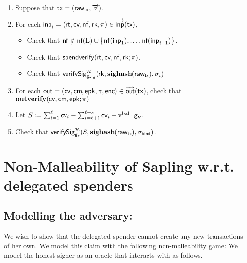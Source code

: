 \documentclass[11pt]{article}
\numberwithin{equation}{section} %
\numberwithin{figure}{section} %
\newcommand{\inp}{\ensuremath{\mathsf{inp}}\xspace}
\newcommand{\inps}{\ensuremath{\overrightarrow{\mathsf{inp}}}\xspace}
\newcommand{\outs}{\ensuremath{\overrightarrow{\mathsf{out}}}\xspace}
\newcommand{\out}{\ensuremath{\mathsf{out}}\xspace}
\newcommand{\set}[1]{\ensuremath{\left\{#1\right\}}\xspace}
\begin{document}
\noindent
\underline{\verifytx{\ledger}{\tx}}

\begin{enumerate}
\item Suppose that $\mathsf{tx}=(\mathsf{raw_{tx}},\overrightarrow{\mathsf{\sigma}})$.
\item For each $\inp_i =(\rt,\cv,\nf,\rk,\prf)\in \inps(\tx)$,
 \begin{itemize}
  \item Check that $\nf \notin \nfof{\ledger}\cup \set{\nfof{\inp_1},\ldots,\nfof{\inp_{i-1}}}$.
  \item Check that $\mathsf{spendverify}(\mathsf{rt},\mathsf{cv},\mathsf{nf},\mathsf{rk};\pi)$.
  \item Check that $\mathsf{verifySig}^{\mathcal R}_{\mathsf{g}_{\mathbf{sig}}}(\mathsf{rk},\mathbf{sighash}(\mathsf{raw_{tx}}),\sigma_i)$
 \end{itemize}
\item For each $\out = (\cv,\cm,\epk,\prf,\noteenc)\in\outs(\tx)$, check that  $\mathbf{outverify}(\mathsf{cv},\mathsf{cm},\mathsf{epk};\pi)$
\item Let $S:=\sum_{i=1}^\ell \mathsf{cv}_i - \sum_{i=\ell+1}^{\ell+s}\mathsf{cv}_i-\mathrm{v^{bal}}\cdot \mathsf{g}_{\mathbf{v}}$.
\item Check that $\mathsf{verifySig}^{\mathcal R}_{\mathsf{g}_\mathbf{r}}(S,\mathbf{sighash}(\mathsf{raw_{tx}}),\sigma_{\mathsf{bind}})$.
\end{enumerate}







\section{Non-Malleability of Sapling w.r.t. delegated spenders}

\subsection*{Modelling the adversary:}
We wish to show that the delegated spender cannot create any new transactions of her own.
We model this claim with the following non-malleability game:
We model the honest signer as an oracle \oracle that \adv interacts with as follows.
% 
\end{document}
